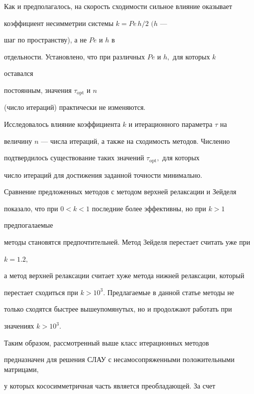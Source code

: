 \bigskip


\par


Как и предполагалось, на скорость сходимости сильное влияние оказывает 


коэффициент несимметрии системы $k=Pe\,h/2$ $(h$ --- 


шаг по пространству), а не $Pe$ и $h$ в 


отдельности. Установлено, что при различных $Pe$ и $h,$ для которых $k$ 


оставался 


постоянным, значения $\tau_{\text{opt}}$ и $n$ 


(число итераций) практически не изменяются. 


 


Исследовалось влияние коэффициента $k$ и итерационного параметра $\tau$ на 


величину $n$ --- числа итераций, а также на сходимость методов. Численно 


подтвердилось существование таких значений $\tau_{\text{opt}},$ для которых 


число итераций для достижения заданной точности минимально. 


 


Сравнение предложенных методов с методом верхней релаксации и Зейделя 


показало, что при $0<k<1$ последние более эффективны, но при $k>1$ 


предпогалаемые 


методы становятся предпочтительней. Метод Зейделя перестает считать уже при 


$k=1{.}2,$ 


а метод верхней релаксации считает хуже метода нижней релаксации, который 


перестает сходиться при $k>10^3.$ Предлагаемые в данной статье методы не 


только сходятся быстрее вышеупомянутых, но и продолжают работать при 


значениях $k>10^3.$ 


 


Таким образом, рассмотренный выше класс итерационных методов 


предназначен для решения СЛАУ с несамосопряженными положительными матрицами, 


у которых кососимметричная часть является преобладающей. За счет 


